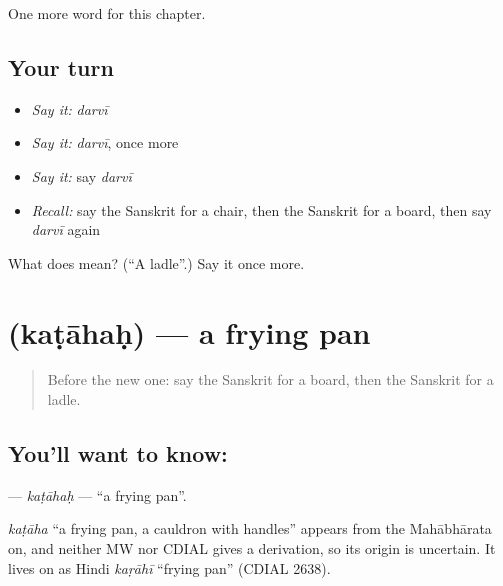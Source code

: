 \begin{grammarlens}[title={What you've built}]
One more word for this chapter.
\end{grammarlens}

\subsection*{Your turn}
\begin{itemize}
\raggedright
  \item \emph{Say it:} \emph{darvī}
  \item \emph{Say it:} \emph{darvī}, once more
  \item \emph{Say it:} say \emph{darvī}
  \item \emph{Recall:} say the Sanskrit for a chair, then the Sanskrit for a board, then say \emph{darvī} again
\end{itemize}

\begin{tcolorbox}[breakable,colback=teal!4,colframe=teal!35!black,title={Before you move on}]
What does  mean? (\textquotedblleft{}A ladle\textquotedblright{}.) Say it once more.
\end{tcolorbox}
\section[\texorpdfstring{\sk{कटाहः} (kaṭāhaḥ)}{कटाहः (kaṭāhaḥ)}]{ (kaṭāhaḥ) — a frying pan}

\label{lesson:SA-C119-katahah}



\begin{quote}
Before the new one: say the Sanskrit for a board, then the Sanskrit for a ladle.
\end{quote}

\subsection*{You'll want to know: }
\textbf{} — \emph{kaṭāhaḥ} — \textquotedblleft{}a frying pan\textquotedblright{}.

\begin{cousinweb}
\emph{kaṭāha} \textquotedblleft{}a frying pan, a cauldron with handles\textquotedblright{} appears from the Mahābhārata on, and neither MW nor CDIAL gives a derivation, so its origin is uncertain. It lives on as Hindi \emph{kaṛāhī} \textquotedblleft{}frying pan\textquotedblright{} (CDIAL 2638).
\end{cousinweb}

